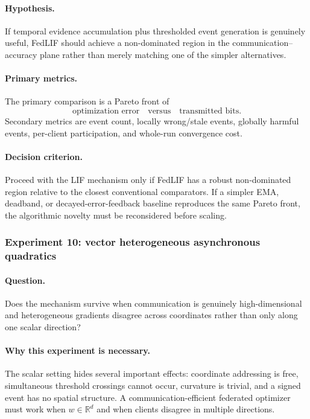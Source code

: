 \paragraph{Hypothesis.}
If temporal evidence accumulation plus thresholded event generation is genuinely useful, FedLIF should achieve a non-dominated region in the communication--accuracy plane rather than merely matching one of the simpler alternatives.

\paragraph{Primary metrics.}
The primary comparison is a Pareto front of
\begin{equation}
  \text{optimization error}\quad\text{versus}\quad\text{transmitted bits}.
\end{equation}
Secondary metrics are event count, locally wrong/stale events, globally harmful events, per-client participation, and whole-run convergence cost.

\paragraph{Decision criterion.}
Proceed with the LIF mechanism only if FedLIF has a robust non-dominated region relative to the closest conventional comparators. If a simpler EMA, deadband, or decayed-error-feedback baseline reproduces the same Pareto front, the algorithmic novelty must be reconsidered before scaling.

\subsubsection{Experiment 10: vector heterogeneous asynchronous quadratics}

\paragraph{Question.}
Does the mechanism survive when communication is genuinely high-dimensional and heterogeneous gradients disagree across coordinates rather than only along one scalar direction?

\paragraph{Why this experiment is necessary.}
The scalar setting hides several important effects: coordinate addressing is free, simultaneous threshold crossings cannot occur, curvature is trivial, and a signed event has no spatial structure. A communication-efficient federated optimizer must work when $w\in\mathbb{R}^d$ and when clients disagree in multiple directions.

